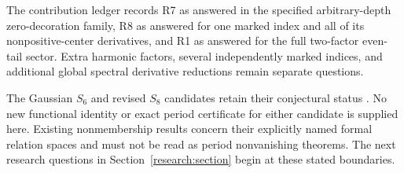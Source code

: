 The contribution ledger records R7 as answered in the specified
arbitrary-depth zero-decoration family, R8 as answered for one marked
index and all of its nonpositive-center derivatives, and R1 as answered
for the full two-factor even-tail sector.  Extra harmonic factors,
several independently marked indices, and additional global spectral
derivative reductions remain separate questions.

The Gaussian $S_6$ and revised $S_8$ candidates retain their
conjectural status \cite{Repository,IncomingParity}.  No new functional
identity or exact period certificate for either candidate is supplied
here.  Existing nonmembership results concern their explicitly named
formal relation spaces and must not be read as period nonvanishing
theorems.  The next research questions in
Section~\ref{research:section} begin at these stated boundaries.
